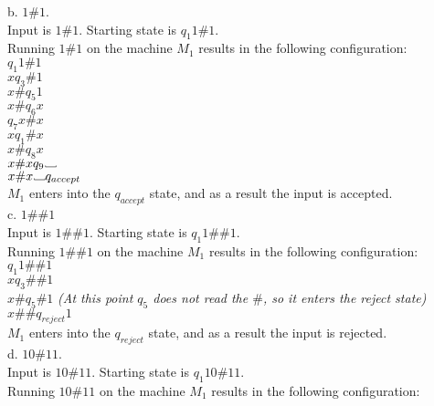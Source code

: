 \documentclass[12pt]{article}
\newcommand\Vtextvisiblespace[1][.8em]{%
	\mbox{\kern.07em\vrule height.3ex}%
	\vbox{\hrule width#1}%
	\hbox{\vrule height.3ex}}
\begin{document}
b. $1\#1$. \\

Input is $1\#1$. Starting state is $q_1 1\#1$. \\
Running $1\#1$ on the machine $M_1$ results in the following configuration: \\

$       q_1 1 \# 1  $ \\
$x      q_3 \# 1    $ \\
$x \#   q_5 1       $ \\
$x \#   q_6 x       $ \\
$       q_7 x \# x  $ \\
$x      q_1 \# x    $ \\
$x \#   q_8 x       $ \\
$x \# x q_9 \Vtextvisiblespace $ \\
$x \# x \Vtextvisiblespace q_{accept} $ \\
$M_1$ enters into the $q_{accept}$ state, and as a result the input is accepted. \\

c. $1\#\#1$ \\

Input is $1\#\#1$. Starting state is $q_1 1\#\#1$. \\
Running $1\#\#1$ on the machine $M_1$ results in the following configuration: \\

$q_1 1 \# \# 1$ \\
$x q_3 \# \# 1$ \\
$x \# q_5 \# 1$ \textit{(At this point $q_5$ does not read the $\#$, so it enters the reject state)} \\
$x \# \# q_{reject} 1 $ \\
$M_1$ enters into the $q_{reject}$ state, and as a result the input is rejected. \\

\pagebreak
d. $10\#11$. \\

Input is $10\#11$. Starting state is $q_1 10\#11$. \\
Running $10\#11$ on the machine $M_1$ results in the following configuration: \\
\end{document}

